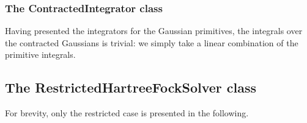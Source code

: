 \documentclass[../../master.tex]{subfiles}
\begin{document}
\subsubsection{The ContractedIntegrator class}
Having presented the integrators for the Gaussian primitives, the integrals over the contracted Gaussians is trivial: we simply take a linear combination of the primitive integrals. 

\subsection{The RestrictedHartreeFockSolver class}
For brevity, only the restricted case is presented in the following. 

%
%
%
%
%
\end{document}
